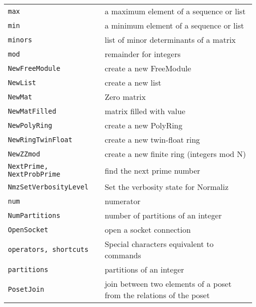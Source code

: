 \documentclass[a4paper]{mybook}
\begin{document}
\begin{center}
\begin{longtable}{ll}
{\verb~max~} &
      a maximum element of a sequence or list\\
   
{\verb~min~} &
      a minimum element of a sequence or list\\
   
{\verb~minors~} &
      list of minor determinants of a matrix\\
   
{\verb~mod~} &
      remainder for integers\\
   
{\verb~NewFreeModule~} &
      create a new FreeModule\\
   
{\verb~NewList~} &
      create a new list\\
   
{\verb~NewMat~} &
      Zero matrix\\
   
{\verb~NewMatFilled~} &
      matrix filled with value\\
   
{\verb~NewPolyRing~} &
      create a new PolyRing\\
   
{\verb~NewRingTwinFloat~} &
      create a new twin-float ring\\
   
{\verb~NewZZmod~} &
      create a new finite ring (integers mod N)\\
   
{\verb~NextPrime, NextProbPrime~} &
      find the next prime number\\
   
{\verb~NmzSetVerbosityLevel~} &
      Set the verbosity state for Normaliz\\
   
{\verb~num~} &
      numerator\\
   
{\verb~NumPartitions~} &
      number of partitions of an integer\\
   
{\verb~OpenSocket~} &
      open a socket connection\\
   
{\verb~operators, shortcuts~} &
      Special characters equivalent to commands\\
   
{\verb~partitions~} &
      partitions of an integer\\
   
{\verb~PosetJoin~} &
      join between two elements of a poset from the relations of the poset\\
   

\end{longtable}
\end{center}
\end{document}
